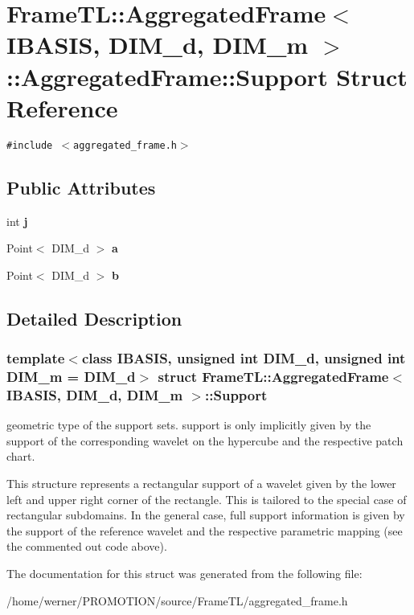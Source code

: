 \hypertarget{structFrameTL_1_1AggregatedFrame_1_1Support}{
\section{FrameTL::AggregatedFrame$<$ IBASIS, DIM\_\-d, DIM\_\-m $>$::AggregatedFrame::Support Struct Reference}
\label{structFrameTL_1_1AggregatedFrame_1_1Support}
}
{\tt \#include $<$aggregated\_\-frame.h$>$}

\subsection*{Public Attributes}
\begin{CompactItemize}
\item 
\hypertarget{structFrameTL_1_1AggregatedFrame_1_1Support_b9ac2316c6e2a2b35f5b720d718bc2cc}{
int \textbf{j}}
\label{structFrameTL_1_1AggregatedFrame_1_1Support_b9ac2316c6e2a2b35f5b720d718bc2cc}

\item 
\hypertarget{structFrameTL_1_1AggregatedFrame_1_1Support_eac1b4cd44ab0f652dfefa7c0c0af4d2}{
Point$<$ DIM\_\-d $>$ \textbf{a}}
\label{structFrameTL_1_1AggregatedFrame_1_1Support_eac1b4cd44ab0f652dfefa7c0c0af4d2}

\item 
\hypertarget{structFrameTL_1_1AggregatedFrame_1_1Support_eda7a6cca85d0e7c614fe60fe823596c}{
Point$<$ DIM\_\-d $>$ \textbf{b}}
\label{structFrameTL_1_1AggregatedFrame_1_1Support_eda7a6cca85d0e7c614fe60fe823596c}

\end{CompactItemize}


\subsection{Detailed Description}
\subsubsection*{template$<$class IBASIS, unsigned int DIM\_\-d, unsigned int DIM\_\-m = DIM\_\-d$>$ struct FrameTL::AggregatedFrame$<$ IBASIS, DIM\_\-d, DIM\_\-m $>$::Support}

geometric type of the support sets. support is only implicitly given by the support of the corresponding wavelet on the hypercube and the respective patch chart.

This structure represents a rectangular support of a wavelet given by the lower left and upper right corner of the rectangle. This is tailored to the special case of rectangular subdomains. In the general case, full support information is given by the support of the reference wavelet and the respective parametric mapping (see the commented out code above). 

The documentation for this struct was generated from the following file:\begin{CompactItemize}
\item 
/home/werner/PROMOTION/source/FrameTL/aggregated\_\-frame.h\end{CompactItemize}
